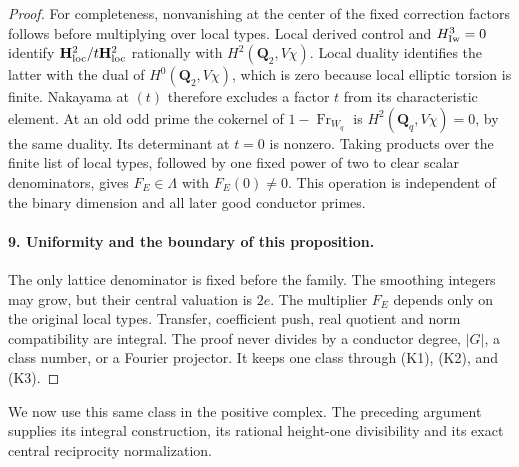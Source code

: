 \begin{proof}
For completeness, nonvanishing at the center of the fixed
correction factors follows before multiplying over local types.
Local derived control and $H^3_{\rm Iw}=0$ identify
$\mathbf H^2_{\rm loc}/t\mathbf H^2_{\rm loc}$ rationally with
$H^2(\mathbf Q_2,V\chi)$. Local duality identifies the latter
with the dual of $H^0(\mathbf Q_2,V\chi)$, which is zero because
local elliptic torsion is finite. Nakayama at $(t)$ therefore
excludes a factor $t$ from its characteristic element.
At an old odd prime the cokernel of
$1-\operatorname{Fr}_{W_q}$ is $H^2(\mathbf Q_q,V\chi)=0$,
by the same duality. Its determinant at $t=0$ is nonzero.
Taking products over the finite list of local types, followed by
one fixed power of two to clear scalar denominators, gives
$F_E\in\Lambda$ with $F_E(0)\ne0$. This operation is independent
of the binary dimension and all later good conductor primes.


\paragraph{9. Uniformity and the boundary of this proposition.}
The only lattice denominator is fixed before the family. The
smoothing integers may grow, but their central valuation is $2e$.
The multiplier $F_E$ depends only on the original local types.
Transfer, coefficient push, real quotient and norm compatibility
are integral. The proof never divides by a conductor degree,
$|G|$, a class number, or a Fourier projector. It keeps one class
through (K1), (K2), and (K3).
\end{proof}

We now use this same class in the positive complex. The preceding
argument supplies its integral construction, its rational height-one
divisibility and its exact central reciprocity normalization.

